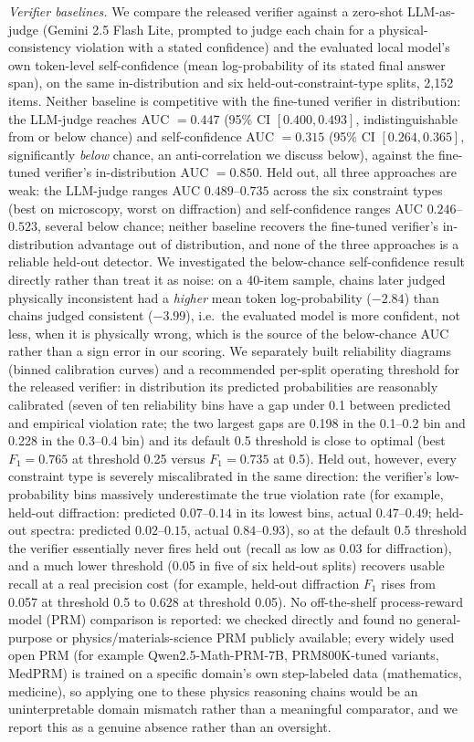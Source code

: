 \documentclass[pdflatex,sn-nature]{sn-jnl}
\begin{document}
\noindent\emph{Verifier baselines.} We compare the released verifier against a zero-shot
LLM-as-judge (Gemini 2.5 Flash Lite, prompted to judge each chain for a physical-consistency
violation with a stated confidence) and the evaluated local model's own token-level
self-confidence (mean log-probability of its stated final answer span), on the same
in-distribution and six held-out-constraint-type splits, 2{,}152 items. Neither baseline
is competitive with the fine-tuned verifier in distribution: the LLM-judge reaches
AUC $=0.447$ (95\% CI $[0.400,0.493]$, indistinguishable from or below chance) and
self-confidence AUC $=0.315$ (95\% CI $[0.264,0.365]$, significantly \emph{below} chance,
an anti-correlation we discuss below), against the fine-tuned verifier's in-distribution
AUC $=0.850$. Held out, all three approaches are weak: the LLM-judge ranges AUC
$0.489$--$0.735$ across the six constraint types (best on microscopy, worst on diffraction)
and self-confidence ranges AUC $0.246$--$0.523$, several below chance; neither baseline
recovers the fine-tuned verifier's in-distribution advantage out of distribution, and
none of the three approaches is a reliable held-out detector. We investigated the
below-chance self-confidence result directly rather than treat it as noise: on a 40-item
sample, chains later judged physically inconsistent had a \emph{higher} mean token
log-probability ($-2.84$) than chains judged consistent ($-3.99$), i.e.\ the evaluated
model is more confident, not less, when it is physically wrong, which is the source of the
below-chance AUC rather than a sign error in our scoring. We separately built reliability
diagrams (binned calibration curves) and a recommended per-split operating threshold for
the released verifier: in distribution its predicted probabilities are reasonably
calibrated (seven of ten reliability bins have a gap under 0.1 between predicted and
empirical violation rate; the two largest gaps are 0.198 in the 0.1--0.2 bin and 0.228 in
the 0.3--0.4 bin) and its default 0.5 threshold is close to optimal (best $F_1=0.765$ at threshold
0.25 versus $F_1=0.735$ at 0.5). Held out, however, every constraint type is severely
miscalibrated in the same direction: the verifier's low-probability bins massively
underestimate the true violation rate (for example, held-out diffraction: predicted
$0.07$--$0.14$ in its lowest bins, actual $0.47$--$0.49$; held-out spectra: predicted
$0.02$--$0.15$, actual $0.84$--$0.93$), so at the default 0.5 threshold the verifier
essentially never fires held out (recall as low as 0.03 for diffraction), and a much lower
threshold (0.05 in five of six held-out splits) recovers usable recall at a real precision
cost (for example, held-out diffraction $F_1$ rises from 0.057 at threshold 0.5 to 0.628 at
threshold 0.05). No off-the-shelf process-reward model (PRM) comparison is reported: we
checked directly and found no general-purpose or physics/materials-science PRM publicly
available; every widely used open PRM (for example Qwen2.5-Math-PRM-7B, PRM800K-tuned
variants, MedPRM) is trained on a specific domain's own step-labeled data (mathematics,
medicine), so applying one to these physics reasoning chains would be an uninterpretable
domain mismatch rather than a meaningful comparator, and we report this as a genuine
absence rather than an oversight.
\end{document}
